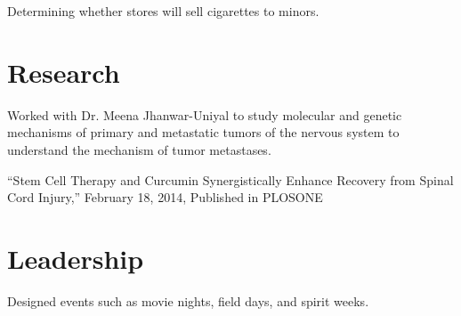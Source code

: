 \documentclass[letterpaper]{deedy-resume} %
\begin{document}
\begin{minipage}[t]{0.58\textwidth}

\begin{tightitemize}
\item Determining whether stores will sell cigarettes to minors.
\end{tightitemize}

\sectionspace %


\section{Research}


\begin{tightitemize}
\item Worked with Dr. Meena Jhanwar-Uniyal to study molecular and genetic mechanisms of primary and metastatic tumors of the nervous system to understand the mechanism of tumor metastases.
\item ``Stem Cell Therapy and Curcumin Synergistically Enhance Recovery from Spinal Cord Injury,'' February 18, 2014, Published in PLOSONE
\end{tightitemize}

\sectionspace %


\section{Leadership}


\begin{tightitemize}
\item Designed events such as movie nights, field days, and spirit weeks.
\end{tightitemize}


\end{minipage}
\end{document}
